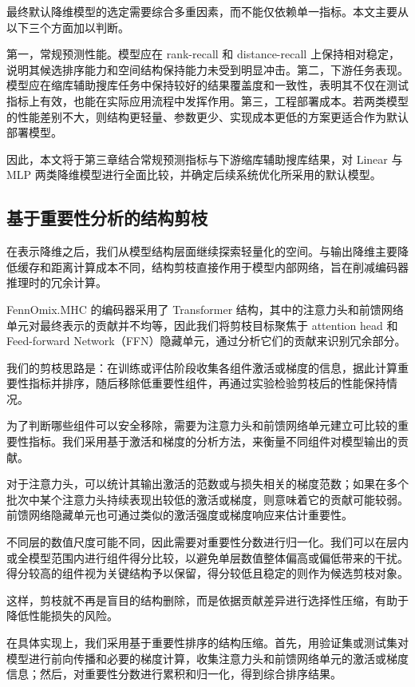 最终默认降维模型的选定需要综合多重因素，而不能仅依赖单一指标。本文主要从以下三个方面加以判断。

第一，常规预测性能。模型应在 rank-recall 和 distance-recall 上保持相对稳定，说明其候选排序能力和空间结构保持能力未受到明显冲击。第二，下游任务表现。模型应在缩库辅助搜库任务中保持较好的结果覆盖度和一致性，表明其不仅在测试指标上有效，也能在实际应用流程中发挥作用。第三，工程部署成本。若两类模型的性能差别不大，则结构更轻量、参数更少、实现成本更低的方案更适合作为默认部署模型。

因此，本文将于第三章结合常规预测指标与下游缩库辅助搜库结果，对 Linear 与 MLP 两类降维模型进行全面比较，并确定后续系统优化所采用的默认模型。

\subsection{基于重要性分析的结构剪枝}

在表示降维之后，我们从模型结构层面继续探索轻量化的空间。与输出降维主要降低缓存和距离计算成本不同，结构剪枝直接作用于模型内部网络，旨在削减编码器推理时的冗余计算。

FennOmix.MHC 的编码器采用了 Transformer 结构，其中的注意力头和前馈网络单元对最终表示的贡献并不均等，因此我们将剪枝目标聚焦于 attention head 和 Feed-forward Network（FFN）隐藏单元，通过分析它们的贡献来识别冗余部分。

我们的剪枝思路是：在训练或评估阶段收集各组件激活或梯度的信息，据此计算重要性指标并排序，随后移除低重要性组件，再通过实验检验剪枝后的性能保持情况。

为了判断哪些组件可以安全移除，需要为注意力头和前馈网络单元建立可比较的重要性指标。我们采用基于激活和梯度的分析方法，来衡量不同组件对模型输出的贡献。

对于注意力头，可以统计其输出激活的范数或与损失相关的梯度范数；如果在多个批次中某个注意力头持续表现出较低的激活或梯度，则意味着它的贡献可能较弱。前馈网络隐藏单元也可通过类似的激活强度或梯度响应来估计重要性。

不同层的数值尺度可能不同，因此需要对重要性分数进行归一化。我们可以在层内或全模型范围内进行组件得分比较，以避免单层数值整体偏高或偏低带来的干扰。得分较高的组件视为关键结构予以保留，得分较低且稳定的则作为候选剪枝对象。

这样，剪枝就不再是盲目的结构删除，而是依据贡献差异进行选择性压缩，有助于降低性能损失的风险。

在具体实现上，我们采用基于重要性排序的结构压缩。首先，用验证集或测试集对模型进行前向传播和必要的梯度计算，收集注意力头和前馈网络单元的激活或梯度信息；然后，对重要性分数进行累积和归一化，得到综合排序结果。

